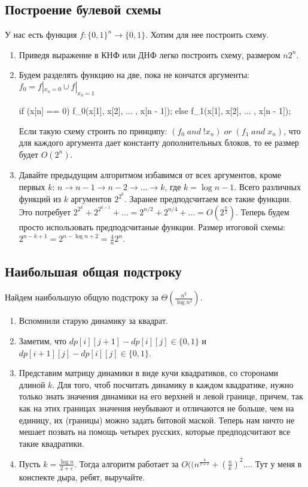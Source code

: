 \subsection{Построение булевой схемы}
\par У нас есть функция $f:\{0, 1\}^n \rightarrow \{0, 1\}$. Хотим для нее построить схему.
\begin{enumerate}
  \item Приведя выражение в КНФ или ДНФ легко построить схему, размером $n 2^n$.
  \item Будем разделять функцию на две, пока не кончатся аргументы: $f_0 = f |_{x_n = 0} \cup f |_{x_n = 1}$
\begin{cppcode}
if (x[n] == 0)
  f_0(x[1], x[2], ... , x[n - 1]);
else 
  f_1(x[1], x[2], ... , x[n - 1]);
\end{cppcode}
  \par Если такую схему строить по принципу: $(f_0 \; and \; !x_n) \; or \; (f_1 \; and \; x_n)$, что для каждого аргумента дает константу дополнительных блоков, то ее размер будет $O(2^n)$.
\item Давайте предыдущим алгоритмом избавимся от всех аргументов, кроме первых $k$: $n\rightarrow n-1 \rightarrow n - 2 \rightarrow \dots \rightarrow k$, где $k = \log{n} - 1$.
  Всего различных функций из $k$ аргументов $2^{2^{k}}$. Заранее предподсчитаем все такие функции. Это потребует $2^{2^{k}} + 2^{2^{k - 1}} + \dots = 2^{n/2} + 2^{n/4} + \dots
  = O(2^{\frac{n}{2}})$. Теперь будем просто использовать предподсчитаные функции. Размер итоговой схемы: $2^{n - k + 1} = 2^{n - \log{n} + 2} = \frac{4}{n}2^n$.
\end{enumerate}
\subsection{Наибольшая общая подстроку}
\par Найдем наибольшую общую подстроку за $\Theta(\frac{n^2}{\log{n}^2})$.
\begin{enumerate}
  \item Вспомнили старую динамику за квадрат.
  \item Заметим, что $dp[i][j + 1] - dp[i][j] \in \{0, 1\}$ и $dp[i + 1][j] - dp[i][j] \in \{0, 1\}$. 
  \item Представим матрицу динамики в виде кучи квадратиков, со сторонами длиной $k$. Для того, чтоб посчитать динамику в каждом квадратике, нужно только знать 
    значения динамики на его верхней и левой границе, причем, так как на этих границах значения неубывают и отличаются не больше, чем на единицу, их (границы) можно
    задать битовой маской. Теперь нам ничто не мешает позвать на помощь четырех русских, которые предподсчитают все такие квадратики.
  \item Пусть $k = \frac{\log{n}}{2 + \varepsilon}$. Тогда алгоритм работает за $O((n^{\frac{4}{2 + \varepsilon}} + (\frac{n}{k})^2 \dots $. Тут у меня в конспекте дыра, ребят, выручайте.
\end{enumerate}


